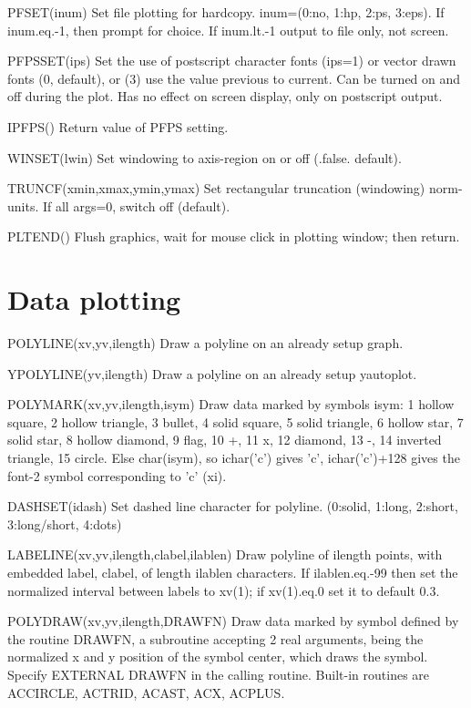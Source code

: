 \documentclass[12pt]{article}
\begin{document}
PFSET(inum) Set file plotting for hardcopy. inum=(0:no, 1:hp, 2:ps, 3:eps).
If inum.eq.-1, then prompt for choice. If inum.lt.-1 output to file
only, not screen.

PFPSSET(ips) Set the use of postscript character fonts (ips=1) or vector
drawn fonts (0, default), or (3) use the value previous to current.
Can be turned on and off during the plot. Has no effect on screen
display, only on postscript output.

IPFPS() Return value of PFPS setting.

WINSET(lwin) Set windowing to axis-region on or off (.false. default).

TRUNCF(xmin,xmax,ymin,ymax) Set rectangular truncation (windowing) norm-units.
If all args=0, switch off (default).

PLTEND() Flush graphics, wait for mouse click in plotting window; then
return.


\section{Data plotting}

POLYLINE(xv,yv,ilength) Draw a polyline on an already setup graph.

YPOLYLINE(yv,ilength) Draw a polyline on an already setup yautoplot.

POLYMARK(xv,yv,ilength,isym) Draw data marked by symbols isym:
1 hollow square, 2 hollow triangle, 3 bullet, 4 solid square, 5 solid 
triangle, 6 hollow star, 7 solid star, 8 hollow diamond, 9 flag, 10 +,
11 x, 12 diamond, 13 -, 14 inverted triangle, 15 circle. Else
char(isym), so ichar('c') gives 'c', ichar('c')+128 gives the font-2
symbol corresponding to 'c' (xi).

DASHSET(idash) Set dashed line character for polyline. 
(0:solid, 1:long, 2:short, 3:long/short, 4:dots)

LABELINE(xv,yv,ilength,clabel,ilablen) Draw polyline of ilength
points, with embedded label, clabel, of length ilablen characters. If
ilablen.eq.-99 then set the normalized interval between labels to
xv(1); if xv(1).eq.0 set it to default 0.3.

POLYDRAW(xv,yv,ilength,DRAWFN) Draw data marked by symbol defined by
the routine DRAWFN, a subroutine accepting 2 real arguments, being the
normalized x and y position of the symbol center, which draws the symbol.
Specify EXTERNAL DRAWFN in the calling routine. Built-in routines are
ACCIRCLE, ACTRID, ACAST, ACX, ACPLUS.
\end{document}

